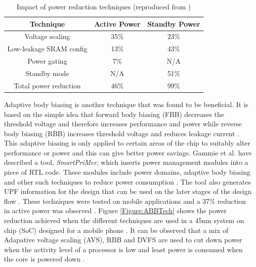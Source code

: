 \documentclass[journal]{IEEEtran}
\begin{document}
\begin{table}[ht]
\begin{center}

	\begin{tabular}{| c | c | c |}
	\hline
	Technique & Active Power & Standby Power \\ [1ex] \hline 
	Voltage scaling & 35\% & 23\% \\ [1ex] \hline
	Low-leakage SRAM config  & 13\% & 43\% \\ [1ex] \hline
	Power gating & 7\% & N/A \\ [1ex] \hline
	Standby mode & N/A & 51\% \\ [1ex] \hline
	Total power reduction & 46\% & 99\% \\ [1ex] \hline
	\end{tabular}
	\caption{Impact of power reduction techniques (reproduced from \protect\cite{FPGA})}
	\label{tab:Impact}
	
\end{center}	
\end{table}	

Adaptive body biasing is another technique that was found to be beneficial. It is based on the simple idea that forward body biasing (FBB) decreases the threshold voltage and therefore increases performance and power while reverse body biasing (RBB) increases threshold voltage and reduces leakage current \cite{ABB}. This adaptive biasing is only applied to certain areas of the chip to suitably alter performance or power and this can give better power savings. Gammie et al. \cite{ABB} have described a tool, \textit{SmartPriMer}, which inserts power management modules into a piece of RTL code. These modules include power domains, adaptive body biasing and other such techniques to reduce power consumption \cite{ABB}. The tool also generates UPF information for the design that can be used on the later stages of the design flow \cite{ABB}. These techniques were tested on mobile applications and a 37\% reduction in active power was observed \cite{ABB}. Figure \ref{Figure:ABBTech} shows the power reduction achieved when the different techniques are used in a 45nm system on chip (SoC) designed for a mobile phone \cite{ABB}. It can be observed that a mix of Adapative voltage scaling (AVS), RBB and DVFS are used to cut down power when the activity level of a processor is low and least power is consumed when the core is powered down \cite{ABB}.
\end{document}
